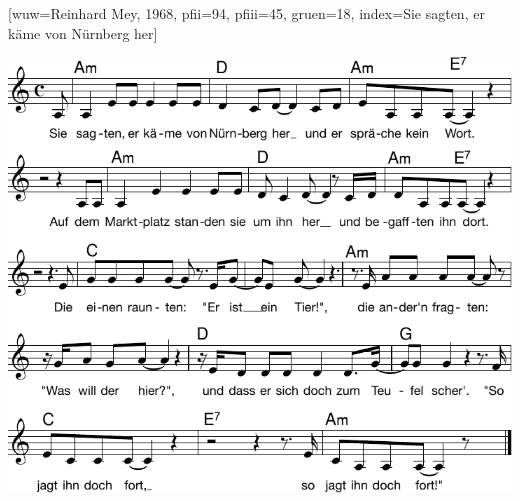 [wuw={Reinhard Mey, 1968}, pfii={94}, pfiii={45}, gruen={18}, index={Sie sagten, er käme von Nürnberg her}]

\beginverse
\endverse
\centering\includegraphics[width=1\textwidth]{Noten/Lied059.pdf}	

